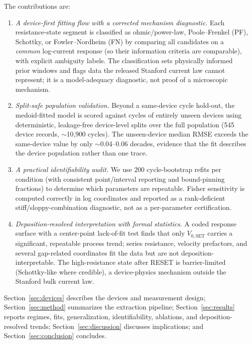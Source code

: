 \documentclass[journal]{IEEEtran}
\begin{document}
The contributions are:
\begin{enumerate}
  \item \emph{A device-first fitting flow with a corrected mechanism
        diagnostic.}  Each resistance-state segment is classified as
        ohmic/power-law, Poole--Frenkel (PF), Schottky, or Fowler--Nordheim
        (FN) by comparing all candidates on a \emph{common} log-current
        response (so their information criteria are comparable), with explicit
        ambiguity labels.  The classification sets physically informed prior
        windows and flags data the released Stanford current law cannot
        represent; it is a model-adequacy diagnostic, not proof of a microscopic
        mechanism.
  \item \emph{Split-safe population validation.}  Beyond a same-device cycle
        hold-out, the medoid-fitted model is scored against cycles of entirely
        unseen devices using deterministic, leakage-free device-level splits
        over the full population (545 device records, $\sim$10{,}900 cycles).
        The unseen-device median RMSE exceeds the same-device value by only
        $\sim$0.04--0.06 decades, evidence that the fit describes the device
        population rather than one trace.
  \item \emph{A practical identifiability audit.}  We use 200 cycle-bootstrap
        refits per condition (with consistent point/interval reporting and
        bound-pinning fractions) to determine which parameters are repeatable.
        Fisher sensitivity is computed correctly in log coordinates and reported
        as a rank-deficient stiff/sloppy-combination diagnostic, not as a
        per-parameter certification.
  \item \emph{Deposition-resolved interpretation with formal statistics.}  A
        coded response surface with a center-point lack-of-fit test finds that
        only $V_{0,\mathrm{SET}}$ carries a significant, repeatable process
        trend; series resistance, velocity prefactors, and several gap-related
        coordinates fit the data but are not deposition-interpretable.  The
        high-resistance state after RESET is barrier-limited (Schottky-like
        where credible), a device-physics mechanism outside the Stanford bulk
        current law.
\end{enumerate}

Section~\ref{sec:devices} describes the devices and measurement design;
Section~\ref{sec:method} summarizes the extraction pipeline;
Section~\ref{sec:results} reports regimes, fits, generalization,
identifiability, ablations, and deposition-resolved trends;
Section~\ref{sec:discussion} discusses implications; and
Section~\ref{sec:conclusion} concludes.
\end{document}
